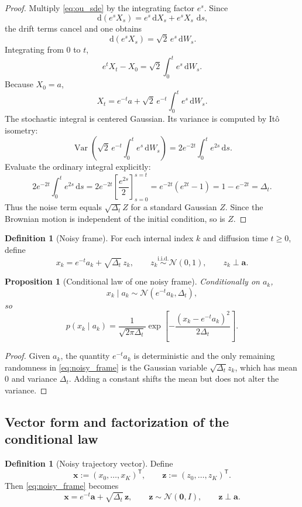 \documentclass[11pt]{article}
\numberwithin{equation}{section}
\newtheorem{proposition}[theorem]{Proposition}
\theoremstyle{definition}
\newtheorem{definition}[theorem]{Definition}
\theoremstyle{remark}
\newcommand{\Var}{\operatorname{Var}}
\newcommand{\Id}{I}
\newcommand{\trans}{\mathsf{T}}
\newcommand{\diff}{\,\mathrm{d}}
\newcommand{\Ncal}{\mathcal{N}}
\begin{document}
\begin{proof}
Multiply \eqref{eq:ou_sde} by the integrating factor $e^s$. Since
\[
\diff(e^sX_s)=e^s\diff X_s+e^sX_s\,\diff s,
\]
the drift terms cancel and one obtains
\[
\diff(e^sX_s)=\sqrt{2}\,e^s\diff W_s.
\]
Integrating from $0$ to $t$,
\[
e^tX_t-X_0=\sqrt{2}\int_0^t e^s\diff W_s.
\]
Because $X_0=a$,
\[
X_t=e^{-t}a+\sqrt{2}\,e^{-t}\int_0^t e^s\diff W_s.
\]
The stochastic integral is centered Gaussian. Its variance is computed by It\^o isometry:
\[
\Var\!\left(\sqrt{2}\,e^{-t}\int_0^t e^s\diff W_s\right)
=
2e^{-2t}\int_0^t e^{2s}\diff s.
\]
Evaluate the ordinary integral explicitly:
\[
2e^{-2t}\int_0^t e^{2s}\diff s
=
2e^{-2t}\left[\frac{e^{2s}}{2}\right]_{s=0}^{s=t}
=
e^{-2t}(e^{2t}-1)
=
1-e^{-2t}
=
\Delta_t.
\]
Thus the noise term equals $\sqrt{\Delta_t}Z$ for a standard Gaussian $Z$. Since the Brownian motion is independent of the initial condition, so is $Z$.
\end{proof}

\begin{definition}[Noisy frame]
For each internal index $k$ and diffusion time $t\geq 0$, define
\begin{equation}\label{eq:noisy_frame}
x_k = e^{-t}a_k+\sqrt{\Delta_t}\,z_k,
\qquad
z_k\stackrel{\mathrm{i.i.d.}}{\sim}\Ncal(0,1),
\qquad
z_k\perp \mathbf a.
\end{equation}
\end{definition}

\begin{proposition}[Conditional law of one noisy frame]\label{prop:cond_scalar}
Conditionally on $a_k$,
\[
x_k\mid a_k \sim \Ncal(e^{-t}a_k,\Delta_t),
\]
so
\[
p(x_k\mid a_k)=\frac{1}{\sqrt{2\pi\Delta_t}}
\exp\!\left[-\frac{(x_k-e^{-t}a_k)^2}{2\Delta_t}\right].
\]
\end{proposition}

\begin{proof}
Given $a_k$, the quantity $e^{-t}a_k$ is deterministic and the only remaining randomness in \eqref{eq:noisy_frame} is the Gaussian variable $\sqrt{\Delta_t}z_k$, which has mean $0$ and variance $\Delta_t$. Adding a constant shifts the mean but does not alter the variance.
\end{proof}

\subsection{Vector form and factorization of the conditional law}

\begin{definition}[Noisy trajectory vector]
Define
\[
\mathbf x:=(x_0,\dots,x_K)^\trans,\qquad \mathbf z:=(z_0,\dots,z_K)^\trans.
\]
Then \eqref{eq:noisy_frame} becomes
\begin{equation}\label{eq:vector_noising}
\mathbf x=e^{-t}\mathbf a+\sqrt{\Delta_t}\,\mathbf z,
\qquad
\mathbf z\sim \Ncal(\mathbf 0,\Id),
\qquad
\mathbf z\perp \mathbf a.
\end{equation}
\end{definition}
\end{document}
